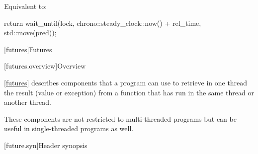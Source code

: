\begin{itemdescr}
\pnum
\effects Equivalent to:
\begin{codeblock}
return wait_until(lock, chrono::steady_clock::now() + rel_time, std::move(pred));
\end{codeblock}
\end{itemdescr}

[futures]{Futures}

[futures.overview]{Overview}

\pnum
\ref{futures} describes components that a \Cpp program can use to retrieve in one thread the
result (value or exception) from a function that has run in the same thread or another thread.
\begin{note} These components are not restricted to multi-threaded programs but can be useful in
single-threaded programs as well. \end{note}

[future.syn]{Header  synopsis}

